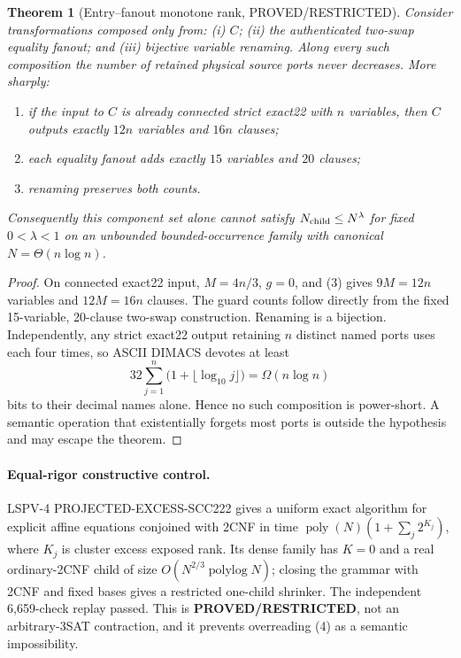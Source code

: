 \documentclass[11pt]{article}
\newtheorem{theorem}{Theorem}
\begin{document}
\begin{theorem}[Entry--fanout monotone rank, PROVED/RESTRICTED]
Consider transformations composed only from: (i) $C$; (ii) the authenticated two-swap equality fanout; and (iii) bijective variable renaming.  Along every such composition the number of retained physical source ports never decreases.  More sharply:
\begin{enumerate}
\item if the input to $C$ is already connected strict exact22 with $n$ variables, then $C$ outputs exactly $12n$ variables and $16n$ clauses;
\item each equality fanout adds exactly $15$ variables and $20$ clauses;
\item renaming preserves both counts.
\end{enumerate}
Consequently this component set alone cannot satisfy $N_{\rm child}\le N^\lambda$ for fixed $0<\lambda<1$ on an unbounded bounded-occurrence family with canonical $N=\Theta(n\log n)$.
\end{theorem}
\begin{proof}
On connected exact22 input, $M=4n/3$, $g=0$, and (3) gives $9M=12n$ variables and $12M=16n$ clauses.  The guard counts follow directly from the fixed 15-variable, 20-clause two-swap construction.  Renaming is a bijection.  Independently, any strict exact22 output retaining $n$ distinct named ports uses each four times, so ASCII DIMACS devotes at least
\[
32\sum_{j=1}^{n}\bigl(1+\lfloor\log_{10}j\rfloor\bigr)=\Omega(n\log n)
\tag{4}
\]
bits to their decimal names alone.  Hence no such composition is power-short.  A semantic operation that existentially forgets most ports is outside the hypothesis and may escape the theorem.
\end{proof}

\paragraph{Equal-rigor constructive control.}
LSPV-4 PROJECTED-EXCESS-SCC222 gives a uniform exact algorithm for explicit affine equations conjoined with 2CNF in time $\operatorname{poly}(N)(1+\sum_j2^{K_j})$, where $K_j$ is cluster excess exposed rank.  Its dense family has $K=0$ and a real ordinary-2CNF child of size $O(N^{2/3}\operatorname{polylog}N)$; closing the grammar with 2CNF and fixed bases gives a restricted one-child shrinker.  The independent 6,659-check replay passed.  This is \textbf{PROVED/RESTRICTED}, not an arbitrary-3SAT contraction, and it prevents overreading (4) as a semantic impossibility.
\end{document}
